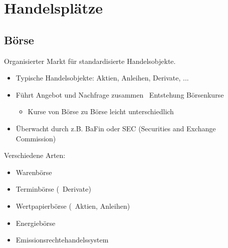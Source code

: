 \documentclass{beamer}
\begin{document}
	\section{Handelsplätze}
	
		\begin{frame}
		\end{frame}
	
		\subsection{Börse}
		
			\begin{frame}
				\begin{definition}
					Organisierter Markt für standardisierte Handelsobjekte.\citewiki[Börse]{B\%Crse}
				\end{definition}
				\begin{itemize}
					\item Typische Handelsobjekte: Aktien, Anleihen, Derivate, ...
					\item Führt Angebot und Nachfrage zusammen \textrightarrow\ Entstehung Börsenkurse
					\begin{itemize}
						\item Kurse von Börse zu Börse leicht unterschiedlich
					\end{itemize}
					\item Überwacht durch z.B. BaFin oder SEC (Securities and Exchange Commission)
				\end{itemize}
			\end{frame}
		
			\begin{frame}
				Verschiedene Arten:
				\begin{itemize}
					\item Warenbörse
					\item Terminbörse (\textrightarrow\ Derivate)
					\item Wertpapierbörse (\textrightarrow\ Aktien, Anleihen)
					\item Energiebörse
					\item Emissionsrechtehandelssystem
				\end{itemize}
			\end{frame}
		
\end{document}

